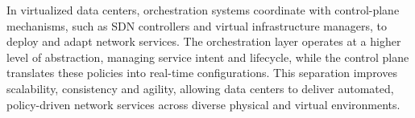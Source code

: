 In virtualized data centers, orchestration systems coordinate with control-plane mechanisms, such as SDN controllers and virtual infrastructure managers, to deploy and adapt network services. The orchestration layer operates at a higher level of abstraction, managing service intent and lifecycle, while the control plane translates these policies into real-time configurations. This separation improves scalability, consistency and agility, allowing data centers to deliver automated, policy-driven network services across diverse physical and virtual environments.